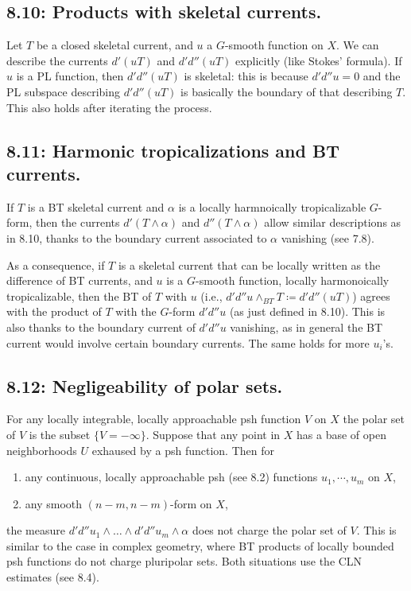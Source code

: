 \documentclass[12pt,reqno]{amsart}
\theoremstyle{definition}
\theoremstyle{remark}
\theoremstyle{citedrem}
\theoremstyle{cited}
\theoremstyle{citeddef}
\theoremstyle{step}
\begin{document}
\subsection*{8.10: Products with skeletal currents. }Let $T$ be a closed skeletal current, and $u$ a $G$-smooth function on $X$. We can describe the currents $d'(uT)$ and $d'd''(uT)$ explicitly (like Stokes' formula). If $u$ is a PL function, then $d'd''(uT)$ is skeletal: this is because $d'd'' u = 0$ and the PL subspace describing $d'd''(uT)$ is basically the boundary of that describing $T$. This also holds after iterating the process. 

\subsection*{8.11: Harmonic tropicalizations and BT currents. }If $T$ is a BT skeletal current and $\alpha$ is a locally harmnoically tropicalizable $G$-form, then the currents $d'(T \wedge \alpha)$ and $d''(T \wedge \alpha)$ allow similar descriptions as in 8.10, thanks to the boundary current associated to $\alpha$ vanishing (see 7.8). 

As a consequence, if $T$ is a skeletal current that can be locally written as the difference of BT currents, and $u$ is a $G$-smooth function, locally harmonoically tropicalizable, then the BT of $T$ with $u$ (i.e., $d'd''u \wedge_{BT} T \coloneqq d'd''(uT)$) agrees with the product of $T$ with the $G$-form $d'd''u$ (as just defined in 8.10). This is also thanks to the boundary current of $d'd''u$ vanishing, as in general the BT current would involve certain boundary currents. The same holds for more $u_i$'s. 

\subsection*{8.12: Negligeability of polar sets. }
For any locally integrable, locally approachable psh function $V$ on $X$ the polar set of $V$ is the subset $\{V = -\infty \}$. Suppose that any point in $X$ has a base of open neighborhoods $U$ exhaused by a psh function. Then for
\begin{enumerate}
    \item any continuous, locally approachable psh (see 8.2) functions $u_1, \cdots, u_m$ on $X$, 
    \item any smooth $(n-m,n-m)$-form on $X$, 
\end{enumerate}
the measure $d'd''u_1 \wedge \ldots \wedge d'd''u_m \wedge \alpha$ does not charge the polar set of $V$. This is similar to the case in complex geometry, where BT products of locally bounded psh functions do not charge pluripolar sets. Both situations use the CLN estimates (see 8.4).
\end{document}
